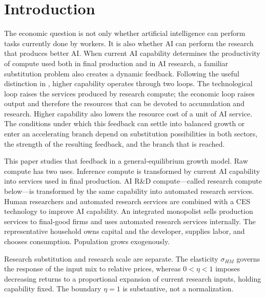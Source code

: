 \section{Introduction}

The economic question is not only whether artificial intelligence can perform
tasks currently done by workers. It is also whether AI can perform the research
that produces better AI. When current AI capability determines the productivity
of compute used both in final production and in AI research, a familiar
substitution problem also creates a dynamic feedback. Following the useful
distinction in \citet{davidsonetal2026}, higher capability operates through two
loops. The technological loop raises the services produced by research compute;
the economic loop raises output and therefore the resources that can be devoted
to accumulation and research. Higher capability also lowers the resource cost of
a unit of AI service. The conditions under which this
feedback can settle into balanced growth or enter an accelerating branch depend
on substitution possibilities in both sectors, the strength of the resulting
feedback, and the branch that is reached.

This paper studies that feedback in a general-equilibrium growth model. Raw
compute has two uses. Inference compute is transformed by current AI capability
into services used in final production. AI R\&D compute---called research compute
below---is transformed by the same capability into automated research services.
Human researchers and automated research services are combined with a CES
technology to improve AI capability.
An integrated monopolist sells production services to final-good firms and uses
automated research services internally. The representative household owns capital
and the developer, supplies labor, and chooses consumption. Population grows
exogenously.

Research substitution and research scale are separate. The elasticity
\(\sigma_{HM}\) governs the response of the input mix to relative prices, whereas
\(0<\eta<1\) imposes decreasing returns to a proportional expansion of current
research inputs, holding capability fixed. The boundary \(\eta=1\) is substantive,
not a normalization.

